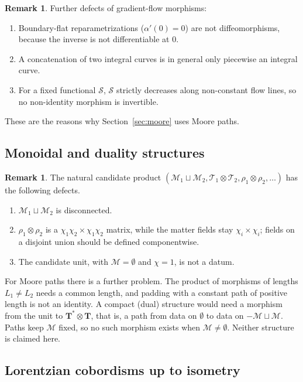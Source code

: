 \documentclass[11pt,a4paper,reqno]{amsart}
\theoremstyle{definition}
\newtheorem{remark}[theorem]{Remark}
\numberwithin{equation}{section}
\begin{document}
\begin{remark}
Further defects of gradient-flow morphisms:
\begin{enumerate}[label=(\alph*)]
    \item Boundary-flat reparametrizations ($\alpha'(0)=0$) are not diffeomorphisms, because the inverse is not differentiable at $0$.
    \item A concatenation of two integral curves is in general only piecewise an integral curve.
    \item For a fixed functional $\mathcal{S}$, $\mathcal{S}$ strictly decreases along non-constant flow lines, so no non-identity morphism is invertible.
\end{enumerate}
These are the reasons why Section~\ref{sec:moore} uses Moore paths.
\end{remark}

\subsection{Monoidal and duality structures}

\begin{remark}\label{rem:monoidal}
The natural candidate product $(\mathcal{M}_1\sqcup\mathcal{M}_2,\mathcal{T}_1\otimes\mathcal{T}_2,\rho_1\otimes\rho_2,\dots)$ has the following defects.
\begin{enumerate}[label=(\alph*)]
    \item $\mathcal{M}_1\sqcup\mathcal{M}_2$ is disconnected.
    \item $\rho_1\otimes\rho_2$ is a $\chi_1\chi_2\times\chi_1\chi_2$ matrix, while the matter fields stay $\chi_i\times\chi_i$; fields on a disjoint union should be defined componentwise.
    \item The candidate unit, with $\mathcal{M}=\emptyset$ and $\chi=1$, is not a datum.
\end{enumerate}
For Moore paths there is a further problem. The product of morphisms of lengths $L_1\neq L_2$ needs a common length, and padding with a constant path of positive length is not an identity. A compact (dual) structure would need a morphism from the unit to $\mathbf{T}^*\otimes\mathbf{T}$, that is, a path from data on $\emptyset$ to data on $-\mathcal{M}\sqcup\mathcal{M}$. Paths keep $\mathcal{M}$ fixed, so no such morphism exists when $\mathcal{M}\neq\emptyset$. Neither structure is claimed here.
\end{remark}

\subsection{Lorentzian cobordisms up to isometry}
\end{document}
